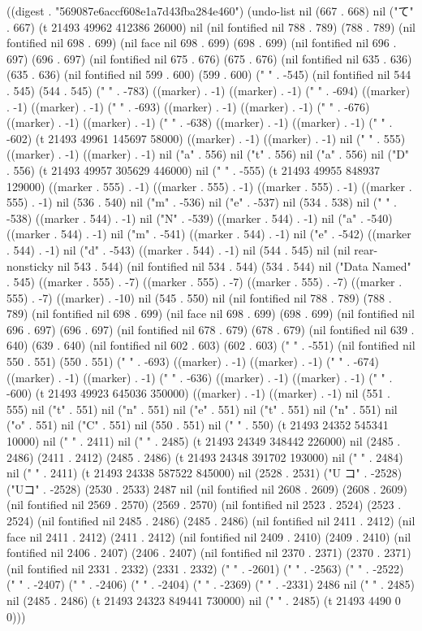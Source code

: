 
((digest . "569087e6accf608e1a7d43fba284e460") (undo-list nil (667 . 668) nil ("て" . 667) (t 21493 49962 412386 26000) nil (nil fontified nil 788 . 789) (788 . 789) (nil fontified nil 698 . 699) (nil face nil 698 . 699) (698 . 699) (nil fontified nil 696 . 697) (696 . 697) (nil fontified nil 675 . 676) (675 . 676) (nil fontified nil 635 . 636) (635 . 636) (nil fontified nil 599 . 600) (599 . 600) (" " . -545) (nil fontified nil 544 . 545) (544 . 545) ("
" . -783) ((marker) . -1) ((marker) . -1) ("
" . -694) ((marker) . -1) ((marker) . -1) ("
" . -693) ((marker) . -1) ((marker) . -1) ("
" . -676) ((marker) . -1) ((marker) . -1) ("
" . -638) ((marker) . -1) ((marker) . -1) ("
" . -602) (t 21493 49961 145697 58000) ((marker) . -1) ((marker) . -1) nil ("
" . 555) ((marker) . -1) ((marker) . -1) nil ("a" . 556) nil ("t" . 556) nil ("a" . 556) nil ("D" . 556) (t 21493 49957 305629 446000) nil (" " . -555) (t 21493 49955 848937 129000) ((marker . 555) . -1) ((marker . 555) . -1) ((marker . 555) . -1) ((marker . 555) . -1) nil (536 . 540) nil ("m" . -536) nil ("e" . -537) nil (534 . 538) nil (" " . -538) ((marker . 544) . -1) nil ("N" . -539) ((marker . 544) . -1) nil ("a" . -540) ((marker . 544) . -1) nil ("m" . -541) ((marker . 544) . -1) nil ("e" . -542) ((marker . 544) . -1) nil ("d" . -543) ((marker . 544) . -1) nil (544 . 545) nil (nil rear-nonsticky nil 543 . 544) (nil fontified nil 534 . 544) (534 . 544) nil ("Data Named" . 545) ((marker . 555) . -7) ((marker . 555) . -7) ((marker . 555) . -7) ((marker . 555) . -7) ((marker) . -10) nil (545 . 550) nil (nil fontified nil 788 . 789) (788 . 789) (nil fontified nil 698 . 699) (nil face nil 698 . 699) (698 . 699) (nil fontified nil 696 . 697) (696 . 697) (nil fontified nil 678 . 679) (678 . 679) (nil fontified nil 639 . 640) (639 . 640) (nil fontified nil 602 . 603) (602 . 603) (" " . -551) (nil fontified nil 550 . 551) (550 . 551) ("
" . -693) ((marker) . -1) ((marker) . -1) ("
" . -674) ((marker) . -1) ((marker) . -1) ("
" . -636) ((marker) . -1) ((marker) . -1) ("
" . -600) (t 21493 49923 645036 350000) ((marker) . -1) ((marker) . -1) nil (551 . 555) nil ("t" . 551) nil ("n" . 551) nil ("e" . 551) nil ("t" . 551) nil ("n" . 551) nil ("o" . 551) nil ("C" . 551) nil (550 . 551) nil ("
" . 550) (t 21493 24352 545341 10000) nil ("
" . 2411) nil ("
" . 2485) (t 21493 24349 348442 226000) nil (2485 . 2486) (2411 . 2412) (2485 . 2486) (t 21493 24348 391702 193000) nil ("
" . 2484) nil ("
" . 2411) (t 21493 24338 587522 845000) nil (2528 . 2531) ("U コ" . -2528) ("Uコ" . -2528) (2530 . 2533) 2487 nil (nil fontified nil 2608 . 2609) (2608 . 2609) (nil fontified nil 2569 . 2570) (2569 . 2570) (nil fontified nil 2523 . 2524) (2523 . 2524) (nil fontified nil 2485 . 2486) (2485 . 2486) (nil fontified nil 2411 . 2412) (nil face nil 2411 . 2412) (2411 . 2412) (nil fontified nil 2409 . 2410) (2409 . 2410) (nil fontified nil 2406 . 2407) (2406 . 2407) (nil fontified nil 2370 . 2371) (2370 . 2371) (nil fontified nil 2331 . 2332) (2331 . 2332) ("
" . -2601) ("
" . -2563) ("
" . -2522) ("
" . -2407) ("
" . -2406) ("
" . -2404) ("
" . -2369) ("
" . -2331) 2486 nil ("
" . 2485) nil (2485 . 2486) (t 21493 24323 849441 730000) nil ("
" . 2485) (t 21493 4490 0 0)))
